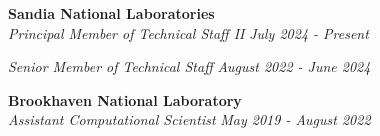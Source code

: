 \newcommand{\myExpFour}{
\item Conducted research and development for User-defined Loop Schedules (UDS) in OpenMP.
\item Integrated OpenMP UDS loop scheduling strategies into Charm++'s CkLoop. 
}

\textbf{Sandia National Laboratories}\\
\textit{Principal Member of Technical Staff II} \hfill \textit{July 2024 - Present}
\noindent
\begin{itemize}\onlyitems[include={1,2}]
\myExpOne
\end{itemize}

\noindent
\textit{Senior Member of Technical Staff} \hfill \textit{August 2022 - June 2024}
\begin{itemize}
\myExpTwo 
\end{itemize} 
\textbf{Brookhaven National Laboratory}\\
\textit{Assistant Computational Scientist} \hfill \textit{May 2019 - August 2022}
\begin{itemize}
\myExpThree
\end{itemize}

